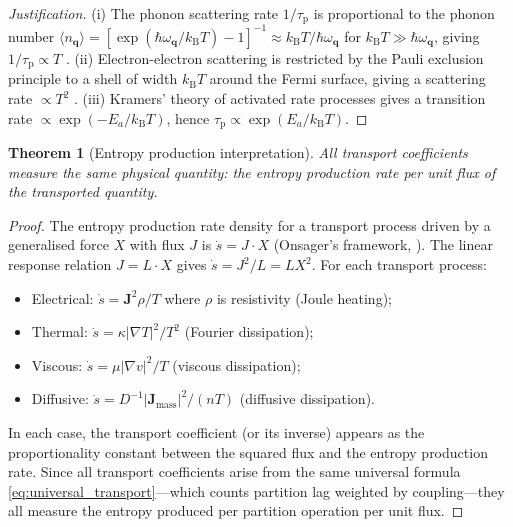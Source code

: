 \documentclass[twocolumn,10pt,a4paper]{article}
\newtheorem{theorem}{Theorem}[section]
\theoremstyle{definition}
\theoremstyle{remark}
\newcommand{\kB}{k_{\mathrm{B}}}
\newcommand{\tauP}{\tau_{\mathrm{p}}}
\newcommand{\vect}[1]{\boldsymbol{#1}}
\begin{document}
\begin{proof}[Justification]
(i) The phonon scattering rate $1/\tauP$ is proportional to the phonon number $\langle n_{\vect{q}} \rangle = [\exp(\hbar\omega_{\vect{q}}/\kB T) - 1]^{-1} \approx \kB T / \hbar\omega_{\vect{q}}$ for $\kB T \gg \hbar\omega_{\vect{q}}$, giving $1/\tauP \propto T$ \citep{Ziman1960}. (ii) Electron-electron scattering is restricted by the Pauli exclusion principle to a shell of width $\kB T$ around the Fermi surface, giving a scattering rate $\propto T^2$ \citep{Ashcroft1976}. (iii) Kramers' theory of activated rate processes gives a transition rate $\propto \exp(-E_a/\kB T)$, hence $\tauP \propto \exp(E_a/\kB T)$.
\end{proof}

\begin{theorem}[Entropy production interpretation]\label{thm:entropy_transport}
All transport coefficients measure the same physical quantity: the entropy production rate per unit flux of the transported quantity.
\end{theorem}

\begin{proof}
The entropy production rate density for a transport process driven by a generalised force $X$ with flux $J$ is $\dot{s} = J \cdot X$ (Onsager's framework, \citealt{Onsager1931a, Onsager1931b, DeGroot1962}). The linear response relation $J = L \cdot X$ gives $\dot{s} = J^2 / L = L X^2$. For each transport process:
\begin{itemize}
\item Electrical: $\dot{s} = \vect{J}^2 \rho / T$ where $\rho$ is resistivity (Joule heating);
\item Thermal: $\dot{s} = \kappa |\nabla T|^2 / T^2$ (Fourier dissipation);
\item Viscous: $\dot{s} = \mu |\nabla v|^2 / T$ (viscous dissipation);
\item Diffusive: $\dot{s} = D^{-1} |\vect{J}_{\mathrm{mass}}|^2 / (nT)$ (diffusive dissipation).
\end{itemize}
In each case, the transport coefficient (or its inverse) appears as the proportionality constant between the squared flux and the entropy production rate. Since all transport coefficients arise from the same universal formula \eqref{eq:universal_transport}---which counts partition lag weighted by coupling---they all measure the entropy produced per partition operation per unit flux.
\end{proof}


\end{document}
